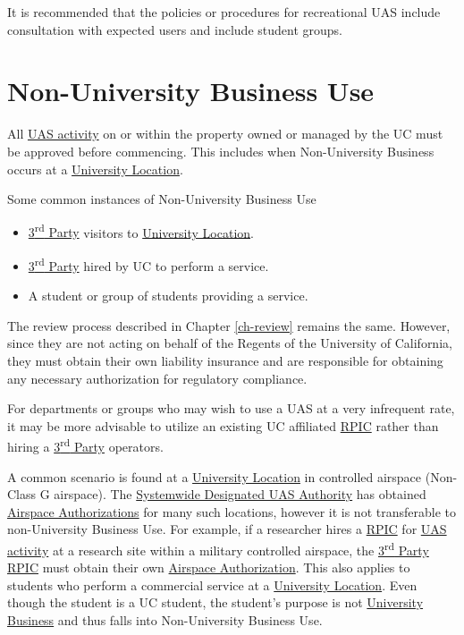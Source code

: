 \documentclass[
]{book}
\providecommand{\tightlist}{%
  \setlength{\itemsep}{0pt}\setlength{\parskip}{0pt}}
\begin{document}
It is recommended that the policies or procedures for recreational UAS include consultation with expected users and include student groups.

\hypertarget{non-university-business-use}{%
\section{Non-University Business Use}\label{non-university-business-use}}

All \protect\hyperlink{UASactivity}{UAS activity} on or within the property owned or managed by the UC must be approved before commencing. This includes when Non-University Business occurs at a \protect\hyperlink{UL}{University Location}.

Some common instances of Non-University Business Use

\begin{itemize}
\tightlist
\item
  \protect\hyperlink{rdparty}{3\textsuperscript{rd} Party} visitors to \protect\hyperlink{UL}{University Location}.
\item
  \protect\hyperlink{rdparty}{3\textsuperscript{rd} Party} hired by UC to perform a service.
\item
  A student or group of students providing a service.
\end{itemize}

The review process described in Chapter \ref{ch-review} remains the same. However, since they are not acting on behalf of the Regents of the University of California, they must obtain their own liability insurance and are responsible for obtaining any necessary authorization for regulatory compliance.

For departments or groups who may wish to use a UAS at a very infrequent rate, it may be more advisable to utilize an existing UC affiliated \protect\hyperlink{RPIC}{RPIC} rather than hiring a \protect\hyperlink{rdparty}{3\textsuperscript{rd} Party} operators.

A common scenario is found at a \protect\hyperlink{UL}{University Location} in controlled airspace (Non-Class G airspace). The \protect\hyperlink{SDA}{Systemwide Designated UAS Authority} has obtained \protect\hyperlink{AA}{Airspace Authorizations} for many such locations, however it is not transferable to non-University Business Use. For example, if a researcher hires a \protect\hyperlink{RPIC}{RPIC} for \protect\hyperlink{UASactivity}{UAS activity} at a research site within a military controlled airspace, the \protect\hyperlink{rdparty}{3\textsuperscript{rd} Party} \protect\hyperlink{RPIC}{RPIC} must obtain their own \protect\hyperlink{AA}{Airspace Authorization}. This also applies to students who perform a commercial service at a \protect\hyperlink{UL}{University Location}. Even though the student is a UC student, the student's purpose is not \protect\hyperlink{UB}{University Business} and thus falls into Non-University Business Use.
\end{document}
